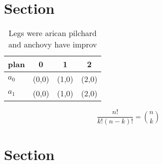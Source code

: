 \documentclass[a4paper]{article}
\begin{document}
\section{Section}

\begin{table}
\begin{adjustbox}{width=0.6\columnwidth}
\begin{tabular}{|l|l|l|l|}
\hline
\textbf{plan} & \multicolumn{1}{c|}{\textbf{0}} & \multicolumn{1}{c|}{\textbf{1}} & \multicolumn{1}{c|}{\textbf{2}} \\ \hline
\textbf{$a_0$}  & (0,0) & (1,0) & (2,0) \\ \hline
\textbf{$a_1$}  & (0,0) & (1,0) & (2,0) \\ \hline
\end{tabular}
\end{adjustbox}
\caption{Legs were arican pilchard and anchovy have improv
}
\end{table}

\[ \frac{n!}{k!(n-k)!} = \binom{n}{k} \]

\section{Section}
\end{document}

